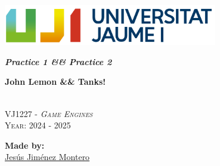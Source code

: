\documentclass[12pt]{article}
\begin{document}
\pagecolor{pageColor}
\color{textColor}
\begin{titlepage}
    \vspace*{\fill}

    \centering
    \parbox{0.8\textwidth}{    %
        \includegraphics[width=0.7\textwidth]{imgs/marca-uji-color-fons-transparent.png}\par\vspace{1cm}

        {\Huge \bfseries \textit{Practice 1 \&\& Practice 2} \par}
        {\Large \bfseries John Lemon \&\& Tanks! \par}

        \textsc{\large }
        \vspace{0.5cm} \\
        \textsc{\Large VJ1227 - \textit{Game Engines}}
        \vspace{0.5cm} \\
        \textsc{\large Year: 2024 - 2025}
        \vfill

        \textbf{Made by:}         \\
        \href{https://www.richardotomislav.com/}{Jesús Jiménez Montero}      \\
    }
    \vspace*{\fill}
\end{titlepage}



\hypertarget{toc}{}

\tableofcontents

\newpage

\listoftables
\newpage

\newpage



\end{document}
